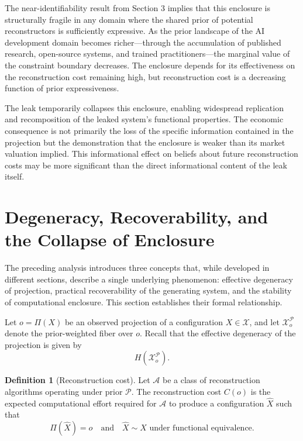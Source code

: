 \documentclass[12pt, oneside]{article}
\theoremstyle{plain}
\theoremstyle{definition}
\newtheorem{definition}[theorem]{Definition}
\theoremstyle{remark}
\newcommand{\proj}{\Pi}
\newcommand{\config}{\mathcal{X}}
\newcommand{\prior}{\mathcal{P}}
\begin{document}
The near-identifiability result from Section 3 implies that this enclosure is structurally
fragile in any domain where the shared prior of potential reconstructors is sufficiently
expressive. As the prior landscape of the AI development domain becomes richer---through
the accumulation of published research, open-source systems, and trained practitioners---the
marginal value of the constraint boundary decreases. The enclosure depends for its
effectiveness on the reconstruction cost remaining high, but reconstruction cost is a
decreasing function of prior expressiveness.

The leak temporarily collapses this enclosure, enabling widespread replication and
recomposition of the leaked system's functional properties. The economic consequence is not
primarily the loss of the specific information contained in the projection but the
demonstration that the enclosure is weaker than its market valuation implied. This
informational effect on beliefs about future reconstruction costs may be more significant
than the direct informational content of the leak itself.

\section{Degeneracy, Recoverability, and the Collapse of Enclosure}

The preceding analysis introduces three concepts that, while developed in different
sections, describe a single underlying phenomenon: effective degeneracy of projection,
practical recoverability of the generating system, and the stability of computational
enclosure. This section establishes their formal relationship.

Let $o = \proj(X)$ be an observed projection of a configuration $X \in \config$, and
let $\config_o^{\prior}$ denote the prior-weighted fiber over $o$. Recall that the
effective degeneracy of the projection is given by
\[
  H(\config_o^{\prior}).
\]

\begin{definition}[Reconstruction cost]
Let $\mathcal{A}$ be a class of reconstruction algorithms operating under prior
$\prior$. The reconstruction cost $C(o)$ is the expected computational effort required
for $\mathcal{A}$ to produce a configuration $\hat{X}$ such that
\[
  \proj(\hat{X}) = o \quad \text{and} \quad \hat{X} \sim X \text{ under functional equivalence}.
\]
\end{definition}
\end{document}

